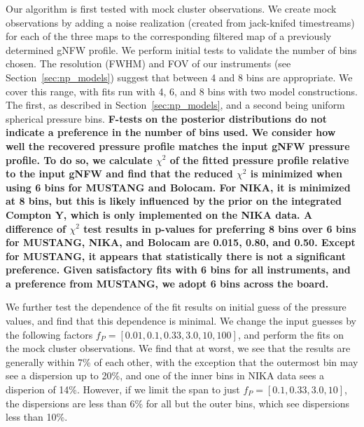 \documentclass[twocolumn,traditabstract]{aa}
\begin{document}
Our algorithm is first tested with mock cluster observations. We create mock observations by adding
a noise realization (created from jack-knifed timestreams) for each of the three maps to the
corresponding filtered map of a previously determined \citep{romero2017} gNFW profile.
We perform initial tests to validate the number of bins chosen. The resolution (FWHM) and FOV of our
instruments (see Section~\ref{sec:np_models}) suggest that between 4 and 8 bins are appropriate.
We cover this range, with fits run with 4, 6, and 8 bins with two model constructions. The first,
as described in Section~\ref{sec:np_models}, and a second being uniform spherical pressure bins.
\textbf{F-tests on the posterior distributions do not indicate a preference in the number of bins used.
We consider how well the recovered pressure profile matches the input gNFW pressure profile. To do so,
we calculate $\chi^2$ of the fitted pressure profile relative to the input gNFW and find
that the reduced $\chi^2$ is minimized when using 6 bins for MUSTANG and Bolocam. For NIKA, it is
minimized at 8 bins, but this is likely influenced by the prior on the integrated Compton Y,
which is only implemented on the NIKA data. A difference of $\chi^2$ test results in p-values for
preferring 8 bins over 6 bins for MUSTANG, NIKA, and Bolocam are 0.015, 0.80, and 0.50. Except for
MUSTANG, it appears that statistically there is not a significant preference. Given satisfactory
fits with 6 bins for all instruments, and a preference from MUSTANG, we adopt 6 bins across the board.}


We further test the dependence of the fit results on initial guess of the pressure values, and find that this
dependence is minimal. We change the input guesses by the
following factors $f_P = [0.01,0.1,0.33,3.0,10,100]$, and perform the fits on the mock cluster observations.
We find that at worst, we see that the results are generally within 7\% of each other, with the exception
that the outermost bin may see a dispersion up to 20\%, and one of the inner bins in NIKA data sees a disperion
of 14\%. However, if we limit the span to just $f_P = [0.1,0.33,3.0,10]$, the dispersions are less than 6\%
for all but the outer bins, which see dispersions less than 10\%.
\end{document}
